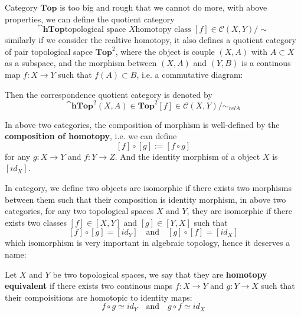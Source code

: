 \begin{remark}
    Category \(\mathbf{Top}\) is too big and rough that we cannot do more, with above properties, we can define the quotient category
    \[\cat{\mathbf{hTop}}{\text{topological space } X}{\text{homotopy class } [f] \in \mathcal{C}(X,Y)/\sim}\]
    similarly if we consider the realtive homotopy, it also defines a quotient category of pair topological sapce \(\mathbf{Top}^2\), where the object is couple \((X,A)\) with \(A \subset X\) as a subspace, and the morphism between \((X,A)\) and \((Y,B)\) is a continous map \(f:X \to Y\) such that \(f(A) \subset B\), i.e. a commutative diagram:
     Then the correspondence quotient category is denoted by
     \[\cat{\mathbf{hTop}^2}{(X,A) \in \mathbf{Top}^2}{[f] \in \mathcal{C}(X,Y)/\sim_{rel A}}\]

     In above two categories, the composition of morphism is well-defined by the \textbf{composition of homotopy}, i.e. we can define
     \[[f] \circ [g] := [f \circ g]\]
     for any \(g:X \to Y\) and \(f:Y \to Z\). And the identity morphism of a object \(X\) is \([id_X]\).
\end{remark}

In category, we define two objects are isomorphic if there exists two morphisms between them such that their composition is identity morphism, in above two categories, for any two topological spaces \(X \) and \(Y\), they are isomorphic if there exists two classes \([f] \in [X,Y]\) and \([g] \in [Y,X]\) such that
\[[f] \circ [g] = [id_Y] \quad \text{and} \quad [g] \circ [f] = [id_X]\]
which isomorphism is very important in algebraic topology, hence it deserves a name:
\begin{definition}
    Let \(X\) and \(Y\) be two topological spaces, we say that they are \textbf{homotopy equivalent} if there exists two continous maps \(f:X \to Y\) and \(g:Y \to X\) such that their compoisitions are homotopic to identity maps:
    \[f \circ g \simeq id_Y \quad \text{and} \quad g \circ f \simeq id_X\]
\end{definition}

